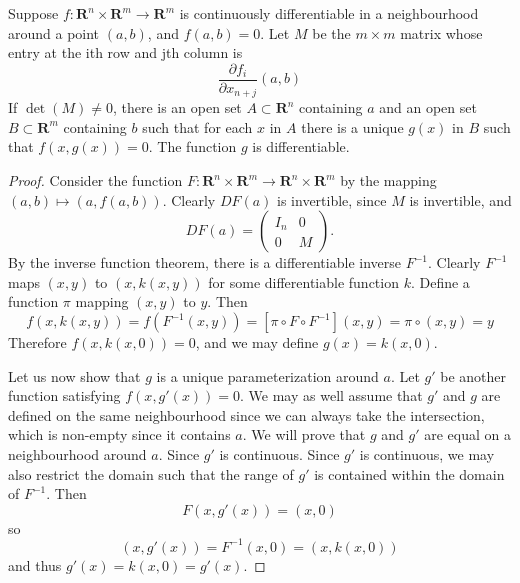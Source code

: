 \begin{corollary}
    Suppose $f:\mathbf{R}^n \times \mathbf{R}^m \to \mathbf{R}^m$ is continuously differentiable in a neighbourhood around a point $(a,b)$, and $f(a,b) = 0$. Let $M$ be the $m \times m$ matrix whose entry at the ith row and jth column is
    \[ \frac{\partial f_i}{\partial x_{n + j}} (a,b) \]
    If $\det(M) \neq 0$, there is an open set $A \subset \mathbf{R}^n$ containing $a$ and an open set $B \subset \mathbf{R}^m$ containing $b$ such that for each $x$ in $A$ there is a unique $g(x)$ in $B$ such that $f(x,g(x)) = 0$. The function $g$ is differentiable.
\end{corollary}
\begin{proof}
    Consider the function $F: \mathbf{R}^n \times \mathbf{R}^m \to \mathbf{R}^n \times \mathbf{R}^m$ by the mapping $(a,b) \mapsto (a,f(a,b))$. Clearly $DF(a)$ is invertible, since $M$ is invertible, and 
    \[ DF(a) = \begin{pmatrix} I_n & 0 \\ 0 & M \end{pmatrix}. \]
    By the inverse function theorem, there is a differentiable inverse $F^{-1}$. Clearly $F^{-1}$ maps $(x,y)$ to $(x,k(x,y))$ for some differentiable function $k$. Define a function $\pi$ mapping $(x,y)$ to $y$. Then
    \[ f(x,k(x,y)) = f(F^{-1}(x,y)) = [\pi \circ F \circ F^{-1}] (x,y) = \pi \circ (x,y) = y \]
    Therefore $f(x,k(x,0)) = 0$, and we may define $g(x) = k(x,0)$.

    Let us now show that $g$ is a unique parameterization around $a$. Let $g'$ be another function satisfying $f(x,g'(x)) = 0$. We may as well assume that $g'$ and $g$ are defined on the same neighbourhood since we can always take the intersection, which is non-empty since it contains $a$. We will prove that $g$ and $g'$ are equal on a neighbourhood around $a$. Since $g'$ is continuous. Since $g'$ is continuous, we may also restrict the domain such that the range of $g'$ is contained within the domain of $F^{-1}$. Then
    \[ F(x,g'(x)) = (x,0) \]
    so
    \[ (x,g'(x)) = F^{-1}(x,0) = (x,k(x,0)) \]
    and thus $g'(x) = k(x,0) = g'(x)$.
\end{proof}

